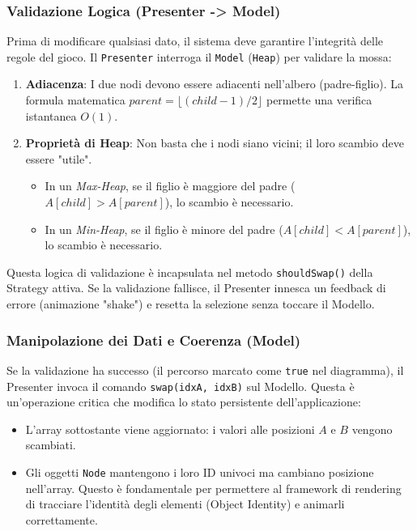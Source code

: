 \documentclass[openany]{theme/uniprthesis}
\begin{document}
\subsubsection{Validazione Logica (Presenter -> Model)}
Prima di modificare qualsiasi dato, il sistema deve garantire l'integrità delle regole del gioco.
Il \texttt{Presenter} interroga il \texttt{Model} (\texttt{Heap}) per validare la mossa:
\begin{enumerate}
    \item \textbf{Adiacenza}: I due nodi devono essere adiacenti nell'albero (padre-figlio). La formula matematica $parent = \lfloor (child - 1) / 2 \rfloor$ permette una verifica istantanea $O(1)$.
    \item \textbf{Proprietà di Heap}: Non basta che i nodi siano vicini; il loro scambio deve essere "utile".
    \begin{itemize}
        \item In un \textit{Max-Heap}, se il figlio è maggiore del padre ($A[child] > A[parent]$), lo scambio è necessario.
        \item In un \textit{Min-Heap}, se il figlio è minore del padre ($A[child] < A[parent]$), lo scambio è necessario.
    \end{itemize}
\end{enumerate}
Questa logica di validazione è incapsulata nel metodo \texttt{shouldSwap()} della Strategy attiva. Se la validazione fallisce, il Presenter innesca un feedback di errore (animazione "shake") e resetta la selezione senza toccare il Modello.

\subsubsection{Manipolazione dei Dati e Coerenza (Model)}
Se la validazione ha successo (il percorso marcato come \texttt{true} nel diagramma), il Presenter invoca il comando \texttt{swap(idxA, idxB)} sul Modello.
Questa è un'operazione critica che modifica lo stato persistente dell'applicazione:
\begin{itemize}
    \item L'array sottostante viene aggiornato: i valori alle posizioni $A$ e $B$ vengono scambiati.
    \item Gli oggetti \texttt{Node} mantengono i loro ID univoci ma cambiano posizione nell'array. Questo è fondamentale per permettere al framework di rendering di tracciare l'identità degli elementi (Object Identity) e animarli correttamente.
\end{itemize}
\end{document}
